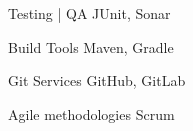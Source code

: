 \begin{cvskills}
  \cvskill
    {Testing | QA} %
    {JUnit, Sonar} %

  \cvskill
    {Build Tools} %
    {Maven, Gradle} %

  \cvskill
    {Git Services} %
    {GitHub, GitLab} %

  \cvskill
    {Agile methodologies} %
    {Scrum} %

\end{cvskills}